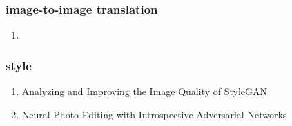 \documentclass[acmlarge]{acmart}
\begin{document}
		\subsubsection{image-to-image translation}
		\begin{enumerate}
			\item
		\end{enumerate}
		\subsubsection{style}
		\begin{enumerate}
			\item Analyzing and Improving the Image Quality of StyleGAN \cite{Karras2020AnalyzingAI} 

			\item Neural Photo Editing with Introspective Adversarial Networks \cite{Brock2017NeuralPE} 

		\end{enumerate}
\end{document}

